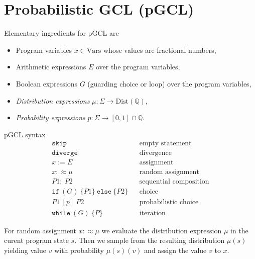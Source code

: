 \documentclass[english]{panikzettel}
\newcommand{\Dist}{\mathrm{Dist}}
\newcommand{\stmtSkip}{\texttt{skip}}
\newcommand{\stmtDiverge}{\texttt{diverge}}
\newcommand{\stmtAsgn}[2]{#1 := #2}
\newcommand{\stmtRasgn}[2]{#1 :\approx #2}
\newcommand{\stmtSeq}[2]{#1;~ #2}
\newcommand{\stmtIf}[3]{\texttt{if}~(#1)~\{ #2 \}~\texttt{else}~\{ #3 \}}
\newcommand{\stmtProb}[3]{#2 ~[#1]~ #3}
\newcommand{\stmtWhile}[2]{\texttt{while}~(#1)~\{ #2 \}}
\newcommand{\Vars}{\mathrm{Vars}}
\newcommand{\rat}{\mathbb{Q}}
\begin{document}
\section{Probabilistic GCL (pGCL)}

\begin{halfboxl}
    Elementary ingredients for pGCL are
    \begin{itemize}
        \item Program variables $x \in \Vars$ whose values are fractional numbers,
        \item Arithmetic expressions $E$ over the program variables,
        \item Boolean expressions $G$ (guarding choice or loop) over the program variables,
        \item \emph{Distribution expressions} $\mu : \Sigma \to \Dist(\rat)$,
        \item \emph{Probability expressions} $p : \Sigma \to [0,1] \cap \rat$.
    \end{itemize}
\end{halfboxl}%
\begin{halfboxr}
    \vspace{-\baselineskip}
    \begin{defi}{pGCL syntax}
        \footnotesize{}
        \vspace{-\baselineskip}
        \begin{align*}
            \stmtSkip &&\text{empty statement}\\
            \stmtDiverge &&\text{divergence} \\
            \stmtAsgn{x}{E} &&\text{assignment} \\
            \stmtRasgn{x}{\mu} &&\text{random assignment}\\
            \stmtSeq{P1}{P2} &&\text{sequential composition} \\
            \stmtIf{G}{P1}{P2}&&\text{choice} \\
            \stmtProb{p}{P1}{P2}&&\text{probabilistic choice}\\
            \stmtWhile{G}{P}&&\text{iteration}
        \end{align*}
    \end{defi}
\end{halfboxr}

For random assignment $\stmtRasgn{x}{\mu}$ we evaluate the distribution expression $\mu$ in the curent program state $s$.
Then we sample from the resulting distribution $\mu(s)$ yielding value $v$ with probability $\mu(s)(v)$ and assign the value $v$ to $x$.
\end{document}
